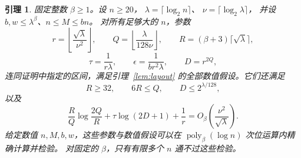 \documentclass[11pt,reqno]{amsart}
\numberwithin{equation}{section}
\newtheorem{lemma}[theorem]{引理}
\theoremstyle{definition}\newtheorem{definition}[theorem]{定义}
\theoremstyle{remark}\newtheorem{remark}[theorem]{注}
\newcommand{\poly}{\operatorname{poly}}
\renewcommand{\le}{\leqslant}
\renewcommand{\ge}{\geqslant}
\begin{document}
\begin{lemma}\label{lem:incidence-parameters}
固定整数 $\beta\ge1$。设 $n\ge20$，
$\lambda=\lceil\log_2 n\rceil$、
$\nu=\lceil\log_2\lambda\rceil$，
并设 $b,w\le\lambda^\beta$、$n\le M\le bn$。
对所有足够大的 $n$，参数
\begin{equation}\label{eq:parameter-QR}
 r=\left\lfloor\frac{\sqrt\lambda}{\nu^2}\right\rfloor,
 \qquad Q=\left\lfloor\frac{\lambda}{128\nu}\right\rfloor,
 \qquad R=(\beta+3)\lceil\sqrt\lambda\rceil,
\end{equation}
\[
 \tau=\frac1{r\lambda},\qquad
 \epsilon=\frac1{br^2\lambda},\qquad D=r^{2Q},
\]
连同证明中指定的区间，满足引理~\ref{lem:layout}
的全部数值假设。它们还满足
\[
 R\ge32,\qquad 6R\le Q,\qquad D\le2^{\lambda/128},
\]
以及
\begin{equation}\label{eq:balanced-cost}
 \frac RQ\log\frac{2Q}{R}+\tau\log(2D+1)+\frac1r
 =O_\beta\!\left(\frac{\nu^2}{\sqrt\lambda}\right).
\end{equation}
给定数值 $n,M,b,w$，这些参数与数值假设可以在
$\poly_\beta(\log n)$ 次位运算内精确计算并检验。
对固定的 $\beta$，只有有限多个 $n$ 通不过这些检验。
\end{lemma}
\end{document}
